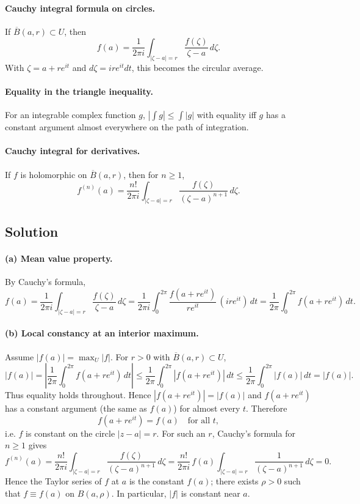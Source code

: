 \documentclass[11pt]{article}
\begin{document}
\paragraph{Cauchy integral formula on circles.}
If $\overline{B}(a,r)\subset U$, then
\[
f(a)=\frac{1}{2\pi i}\int_{|\zeta-a|=r}\frac{f(\zeta)}{\zeta-a}\,d\zeta.
\]
With $\zeta=a+re^{it}$ and $d\zeta=ire^{it}dt$, this becomes the circular average.

\paragraph{Equality in the triangle inequality.}
For an integrable complex function $g$, $\left|\int g\right|\le\int|g|$ with equality iff $g$ has a constant argument almost everywhere on the path of integration.

\paragraph{Cauchy integral for derivatives.}
If $f$ is holomorphic on $\overline{B}(a,r)$, then for $n\ge1$,
\[
f^{(n)}(a)=\frac{n!}{2\pi i}\int_{|\zeta-a|=r}\frac{f(\zeta)}{(\zeta-a)^{n+1}}\,d\zeta.
\]

\subsection*{Solution}

\paragraph{(a) Mean value property.}
By Cauchy’s formula,
\[
f(a)=\frac{1}{2\pi i}\int_{|\zeta-a|=r}\frac{f(\zeta)}{\zeta-a}\,d\zeta
=\frac{1}{2\pi i}\int_{0}^{2\pi}\frac{f(a+re^{it})}{re^{it}}\,(ire^{it})\,dt
=\frac{1}{2\pi}\int_{0}^{2\pi} f(a+re^{it})\,dt.
\]

\paragraph{(b) Local constancy at an interior maximum.}
Assume $|f(a)|=\max_{U}|f|$. For $r>0$ with $\overline{B}(a,r)\subset U$,
\[
|f(a)|
=\left|\frac{1}{2\pi}\int_{0}^{2\pi} f(a+re^{it})\,dt\right|
\le \frac{1}{2\pi}\int_{0}^{2\pi}|f(a+re^{it})|\,dt
\le \frac{1}{2\pi}\int_{0}^{2\pi}|f(a)|\,dt
=|f(a)|.
\]
Thus equality holds throughout. Hence $|f(a+re^{it})|=|f(a)|$ and $f(a+re^{it})$ has a constant argument (the same as $f(a)$) for almost every $t$. Therefore
\[
f(a+re^{it})=f(a)\quad\text{for all }t,
\]
i.e. $f$ is constant on the circle $|z-a|=r$. For such an $r$, Cauchy’s formula for $n\ge1$ gives
\[
f^{(n)}(a)=\frac{n!}{2\pi i}\int_{|\zeta-a|=r}\frac{f(\zeta)}{(\zeta-a)^{n+1}}\,d\zeta
=\frac{n!}{2\pi i}\,f(a)\int_{|\zeta-a|=r}\frac{1}{(\zeta-a)^{n+1}}\,d\zeta=0.
\]
Hence the Taylor series of $f$ at $a$ is the constant $f(a)$; there exists $\rho>0$ such that $f\equiv f(a)$ on $B(a,\rho)$. In particular, $|f|$ is constant near $a$.
\end{document}
